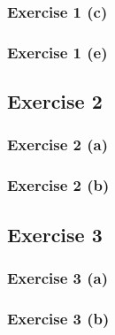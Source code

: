 \documentclass{article}
\begin{document}
\subsubsection{Exercise 1 (c)}

\subsubsection{Exercise 1 (e)}

\subsection{Exercise 2}
\subsubsection{Exercise 2 (a)}

\subsubsection{Exercise 2 (b)}

\subsection{Exercise 3}
\subsubsection{Exercise 3 (a)}

\subsubsection{Exercise 3 (b)}

\end{document}
